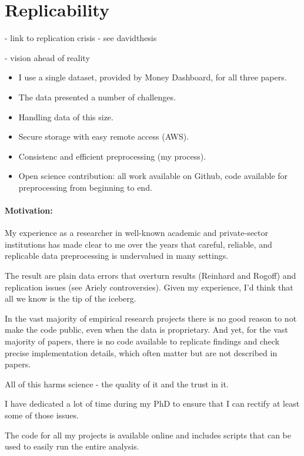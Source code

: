 
\section{Replicability}%










- link to replication crisis - see davidthesis


- vision ahead of reality

\begin{itemize}
    \item I use a single dataset, provided by Money Dashboard, for all three
        papers.

    \item The data presented a number of challenges.

    \item Handling data of this size.

    \item Secure storage with easy remote access (AWS).

    \item Consistenc and efficient preprocessing (my process).

    \item Open science contribution: all work available on Github, code
        available for preprocessing from beginning to end.
\end{itemize}

\paragraph{Motivation:}%
\label{par:motivation_}

My experience as a researcher in well-known academic and private-sector
institutions has made clear to me over the years that careful, reliable, and
replicable data preprocessing is undervalued in many settings.

The result are plain data errors that overturn results (Reinhard and Rogoff)
and replication issues (see Ariely controversies). Given my experience, I'd
think that all we know is the tip of the iceberg.

In the vast majority of empirical research projects there is no good reason to
not make the code public, even when the data is proprietary. And yet, for the
vast majority of papers, there is no code available to replicate findings and
check precise implementation details, which often matter but are not described
in papers.

All of this harms science - the quality of it and the trust in it.

I have dedicated a lot of time during my PhD to ensure that I can rectify at
least some of those issues.

The code for all my projects is available online and includes scripts that can
be used to easily run the entire analysis.

